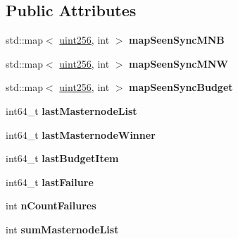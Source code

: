 \subsection*{Public Attributes}
\begin{DoxyCompactItemize}
\item 
\mbox{\label{class_c_masternode_sync_a95f71f31e52d74480038efbca5cd1667}} 
std\+::map$<$ \mbox{\hyperlink{classuint256}{uint256}}, int $>$ {\bfseries map\+Seen\+Sync\+M\+NB}
\item 
\mbox{\label{class_c_masternode_sync_a30f9e522e85188593fd00ee36e7ce977}} 
std\+::map$<$ \mbox{\hyperlink{classuint256}{uint256}}, int $>$ {\bfseries map\+Seen\+Sync\+M\+NW}
\item 
\mbox{\label{class_c_masternode_sync_aeb8a9ca188942073a0eedbccf04574b4}} 
std\+::map$<$ \mbox{\hyperlink{classuint256}{uint256}}, int $>$ {\bfseries map\+Seen\+Sync\+Budget}
\item 
\mbox{\label{class_c_masternode_sync_a74036c30be63054183c57aa33899a3d4}} 
int64\+\_\+t {\bfseries last\+Masternode\+List}
\item 
\mbox{\label{class_c_masternode_sync_afd2c2918ac6a96715a4601bf6089badb}} 
int64\+\_\+t {\bfseries last\+Masternode\+Winner}
\item 
\mbox{\label{class_c_masternode_sync_a9d6ff6f370c525a5e1e10aa36e96cb83}} 
int64\+\_\+t {\bfseries last\+Budget\+Item}
\item 
\mbox{\label{class_c_masternode_sync_a7d1ee3e573d4fed96c18acf0ea0e5317}} 
int64\+\_\+t {\bfseries last\+Failure}
\item 
\mbox{\label{class_c_masternode_sync_ae7bd255bf24c027baadd4c653695ea6b}} 
int {\bfseries n\+Count\+Failures}
\item 
\mbox{\label{class_c_masternode_sync_aac544d38b11affaaeab4543e6c8cbef7}} 
int {\bfseries sum\+Masternode\+List}
\item 
\mbox{\label{class_c_masternode_sync_ad7cc18a007ea81d1f2e7cbfcda2a1a71}} 

\end{DoxyCompactItemize}
